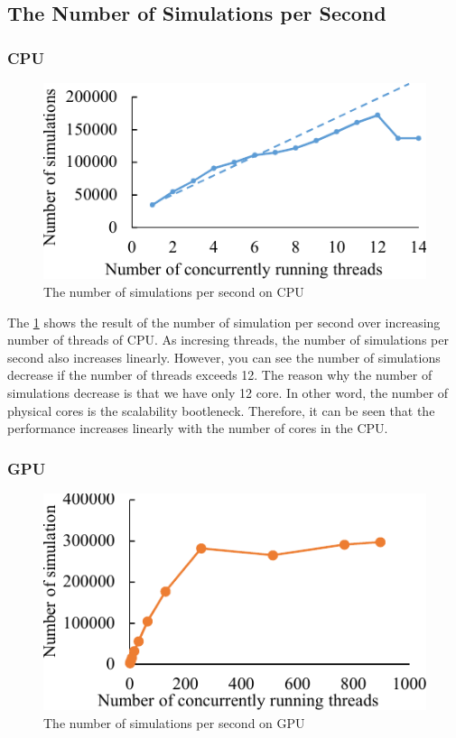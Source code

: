 \subsection{The Number of Simulations per Second}
\subsubsection{CPU}
\begin{figure}
\includegraphics[width=0.95\columnwidth]{figures/cpu_num_simulation.pdf}
\caption{The number of simulations per second on CPU}
\label{fig:cpu_num_simulation}
\end{figure}

The \cref{fig:cpu_num_simulation} shows the result of the number of simulation per second over increasing number of threads of CPU. As incresing threads, the number of simulations per second also increases linearly. 
However, you can see the number of simulations decrease if the number of threads exceeds 12. 
The reason why the number of simulations decrease is that we have only 12 core. In other word, the number of physical cores is the scalability bootleneck. 
Therefore, it can be seen that the performance increases linearly with the number of cores in the CPU. 
\subsubsection{GPU}
\begin{figure}
\includegraphics[width=0.95\columnwidth]{figures/gpu_num_simulation.pdf}
\caption{The number of simulations per second on GPU}
\label{fig:gpu_num_simulation}
\end{figure}

